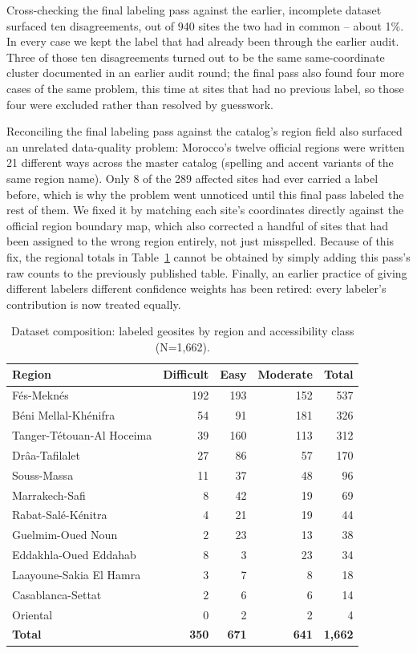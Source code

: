\documentclass[11pt,a4paper]{article}
\renewcommand{\arraystretch}{1.15}
\begin{document}
Cross-checking the final labeling pass against the earlier, incomplete dataset surfaced ten disagreements, out of 940 sites the two had in common -- about 1\%. In every case we kept the label that had already been through the earlier audit. Three of those ten disagreements turned out to be the same same-coordinate cluster documented in an earlier audit round; the final pass also found four more cases of the same problem, this time at sites that had no previous label, so those four were excluded rather than resolved by guesswork.

Reconciling the final labeling pass against the catalog's region field also surfaced an unrelated data-quality problem: Morocco's twelve official regions were written 21 different ways across the master catalog (spelling and accent variants of the same region name). Only 8 of the 289 affected sites had ever carried a label before, which is why the problem went unnoticed until this final pass labeled the rest of them. We fixed it by matching each site's coordinates directly against the official region boundary map, which also corrected a handful of sites that had been assigned to the wrong region entirely, not just misspelled. Because of this fix, the regional totals in Table~\ref{tab:dataset} cannot be obtained by simply adding this pass's raw counts to the previously published table. Finally, an earlier practice of giving different labelers different confidence weights has been retired: every labeler's contribution is now treated equally.

\begin{table}[H]
\centering\small
\caption{Dataset composition: labeled geosites by region and accessibility class (N=1{,}662).}
\label{tab:dataset}
\renewcommand{\arraystretch}{1.15}
\begin{tabular*}{\linewidth}{@{\extracolsep{\fill}}lrrrr@{}}
\toprule
Region & Difficult & Easy & Moderate & Total \\
\midrule
Fés-Meknés & 192 & 193 & 152 & 537 \\
Béni Mellal-Khénifra & 54 & 91 & 181 & 326 \\
Tanger-Tétouan-Al Hoceima & 39 & 160 & 113 & 312 \\
Drâa-Tafilalet & 27 & 86 & 57 & 170 \\
Souss-Massa & 11 & 37 & 48 & 96 \\
Marrakech-Safi & 8 & 42 & 19 & 69 \\
Rabat-Salé-Kénitra & 4 & 21 & 19 & 44 \\
Guelmim-Oued Noun & 2 & 23 & 13 & 38 \\
Eddakhla-Oued Eddahab & 8 & 3 & 23 & 34 \\
Laayoune-Sakia El Hamra & 3 & 7 & 8 & 18 \\
Casablanca-Settat & 2 & 6 & 6 & 14 \\
Oriental & 0 & 2 & 2 & 4 \\
\midrule
\textbf{Total} & \textbf{350} & \textbf{671} & \textbf{641} & \textbf{1{,}662} \\
\bottomrule
\end{tabular*}
\end{table}
\end{document}
